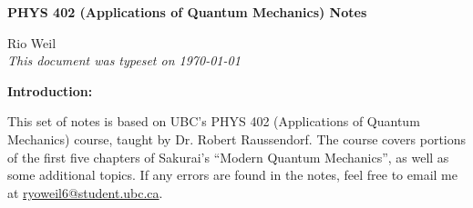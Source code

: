 \documentclass[10pt]{article}
\begin{document}
\begin{tcolorbox}
  \begin{center}
  \begin{Large}
    \textbf{PHYS 402 (Applications of Quantum Mechanics) Notes} \\
    \vspace{5pt}
  \end{Large}
  \begin{large}
        Rio Weil \\
\vspace{5pt}
    \emph{This document was typeset on \today}
  \end{large}
  \end{center}
\end{tcolorbox}

\begin{center}
  \textbf{Introduction:}

  This set of notes is based on UBC's PHYS 402 (Applications of Quantum Mechanics) course, taught by Dr. Robert Raussendorf. The course covers portions of the first five chapters of Sakurai's ``Modern Quantum Mechanics'', as well as some additional topics. If any errors are found in the notes, feel free to email me at \href{mailto:ryoweil6@student.ubc.ca}{ryoweil6@student.ubc.ca}.

\end{center}
\tableofcontents

\newpage


\newpage


\newpage


\newpage


\newpage


\newpage

\end{document}
